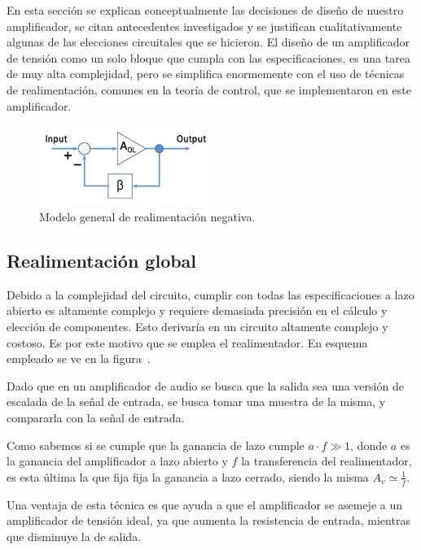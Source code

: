En esta sección se explican conceptualmente las decisiones de diseño de nuestro amplificador, se citan antecedentes investigados y se justifican cualitativamente algunas de las elecciones circuitales que se hicieron.
El diseño de un amplificador de tensión como un solo bloque que cumpla con las especificaciones, es una tarea de muy alta complejidad, pero se simplifica enormemente con el uso de técnicas de realimentación, comunes en la teoría de control, que se implementaron en este amplificador. 

\begin{figure}[H]
	\centering
	\includegraphics[width=0.5\textwidth]{img/realimentacion-negativa-bloque}
	\caption{Modelo general de realimentación negativa.}
	\label{fig:ampli_feedback}
\end{figure}


\subsection{Realimentación global}


Debido a la complejidad del circuito, cumplir con todas las especificaciones a lazo abierto es altamente complejo y requiere demasiada precisión en el cálculo y elección de componentes. Esto derivaría en un circuito altamente complejo y costoso. Es por este motivo que se emplea el realimentador. En esquema empleado se ve en la figura~.

Dado que en un amplificador de audio se busca que la salida sea una versión de escalada de la señal de entrada, se busca tomar una muestra de la misma, y compararla con la señal de entrada. 

Como sabemos si se cumple que la ganancia de lazo cumple $a \cdot f \gg 1$, donde $a$ es la ganancia del amplificador a lazo abierto y $f$ la transferencia del realimentador, es esta última la que fija fija la ganancia a lazo cerrado, siendo la misma $A_{v} \simeq \frac{1}{f}$.

Una ventaja de esta técnica es que ayuda a que el amplificador se asemeje a un amplificador de tensión ideal, ya que aumenta la resistencia de entrada, mientras que disminuye la de salida. 

